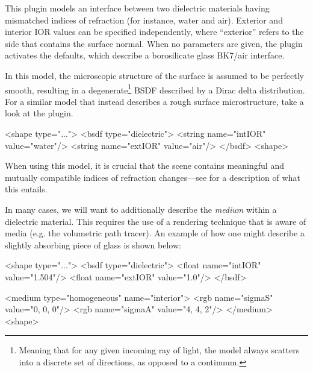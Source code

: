 
This plugin models an interface between two dielectric materials having mismatched
indices of refraction (for instance, water and air). Exterior and interior IOR values
can be specified independently, where ``exterior'' refers to the side that contains
the surface normal. When no parameters are given, the plugin activates the defaults, which
describe a borosilicate glass BK7/air interface.

In this model, the microscopic structure of the surface is assumed to be perfectly
smooth, resulting in a degenerate\footnote{Meaning that for any given incoming ray of light,
the model always scatters into a discrete set of directions, as opposed to a continuum.}
BSDF described by a Dirac delta distribution. For a similar model that instead describes a
rough surface microstructure, take a look at the  plugin.

\begin{xml}[caption=A simple air-to-water interface, label=lst:dielectric-water]
<shape type="...">
    <bsdf type="dielectric">
        <string name="intIOR" value="water"/>
        <string name="extIOR" value="air"/>
    </bsdf>
<shape>
\end{xml}

When using this model, it is crucial that the scene contains
meaningful and mutually compatible indices of refraction changes---see
 for a description of what this entails.

In many cases, we will want to additionally describe the \emph{medium} within a
dielectric material. This requires the use of a rendering technique that is
aware of media (e.g. the volumetric path tracer). An example of how one might
describe a slightly absorbing piece of glass is shown below:
\begin{xml}[caption=A glass material with absorption (based on the
   Beer-Lambert law). This material can only be used by an integrator
   that is aware of participating media., label=lst:dielectric-glass]
<shape type="...">
    <bsdf type="dielectric">
        <float name="intIOR" value="1.504"/>
        <float name="extIOR" value="1.0"/>
    </bsdf>

    <medium type="homogeneous" name="interior">
        <rgb name="sigmaS" value="0, 0, 0"/>
        <rgb name="sigmaA" value="4, 4, 2"/>
    </medium>
<shape>
\end{xml}
\vspace{1cm}

